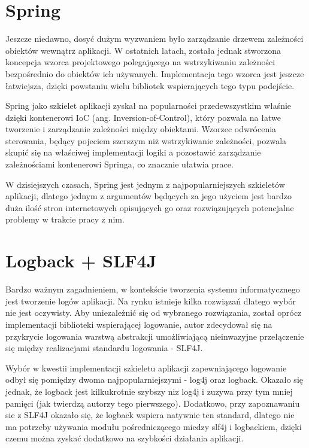 \section{Spring}
Jeszcze niedawno, dosyć dużym wyzwaniem było zarządzanie drzewem zależności obiektów wewnątrz aplikacji. W ostatnich latach, została jednak stworzona koncepcja wzorca projektowego polegającego na wstrzykiwaniu zależności bezpośrednio do obiektów ich używanych. Implementacja tego wzorca jest jeszcze łatwiejsza, dzięki powstaniu wielu bibliotek wspierających tego typu podejście.

Spring jako szkielet aplikacji zyskał na popularności przedewszystkim właśnie dzięki kontenerowi IoC (ang. Inversion-of-Control), który pozwala na łatwe tworzenie i zarządzanie zależności między obiektami. Wzorzec odwrócenia sterowania, będący pojeciem szerszym niż wstrzykiwanie zależności, pozwala skupić się na właściwej implementacji logiki a pozostawić zarządzanie zależnościami kontenerowi Springa, co znacznie ułatwia prace.

W dzisiejszych czasach, Spring jest jednym z najpopularniejszych szkieletów aplikacji, dlatego jednym z argumentów będących za jego użyciem jest bardzo duża ilość stron internetowych opisujących go oraz rozwiązujących potencjalne problemy w trakcie pracy z nim. 

\section{Logback + SLF4J}
Bardzo ważnym zagadnieniem, w kontekście tworzenia systemu informatycznego jest tworzenie logów aplikacji. Na rynku istnieje kilka rozwiązań dlatego wybór nie jest oczywisty. Aby uniezależnić się od wybranego rozwiązania, został oprócz implementacji biblioteki wspierającej logowanie, autor zdecydował się na przykrycie logowania warstwą abstrakcji umożliwiającą nieinwazyjne przełączenie się między realizacjami standardu logowania - SLF4J. 

Wybór w kwestii implementacji szkieletu aplikacji zapewniającego logowanie odbył się pomiędzy dwoma najpopularniejszymi - log4j oraz logback. Okazało się jednak, że logback jest kilkukrotnie szybszy niz log4j i zuzywa przy tym mniej pamięci (jak twierdzą autorzy tego pierwszego). Dodatkowo, przy zapoznawaniu sie z SLF4J okazało się, że logback wspiera natywnie ten standard, dlatego nie ma potrzeby używania modułu pośredniczącego miedzy slf4j i logbackiem, dzięki czemu można zyskać dodatkowo na szybkości działania aplikacji.

